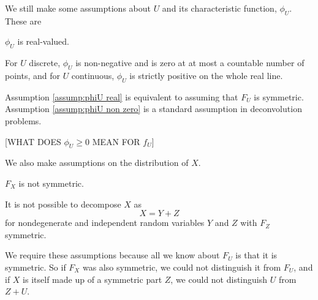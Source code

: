 
	We still make some assumptions about $U$ and its characteristic function, $\phi_U$. These are 
	\begin{assumption}
	\label{assump:phiU real}
		$\phi_U$ is real-valued.
	\end{assumption}
	\begin{assumption}
	\label{assump:phiU non zero}
		For $U$ discrete, $\phi_U$ is non-negative and is zero at at most a countable number of points, and for $U$ continuous, $\phi_U$ is strictly positive on the whole real line.
	\end{assumption}

	Assumption \ref{assump:phiU real} is equivalent to assuming that $F_U$ is symmetric. Assumption \ref{assump:phiU non zero} is a standard assumption in deconvolution problems.

	[WHAT DOES $\phi_U \geq 0$ MEAN FOR $f_U$]

	We also make assumptions on the distribution of $X$. 
	\begin{assumption}
	\label{assumpt: X not symmetric}
		$F_X$ is not symmetric.
	\end{assumption}
	\begin{assumption}
		\label{assump: X indecomposable}
		It is not possible to decompose $X$ as
		\begin{equation}
			X = Y + Z
		\end{equation}
		for nondegenerate and independent random variables $Y$ and $Z$ with $F_Z$ symmetric.
	\end{assumption}

	We require these assumptions because all we know about $F_U$ is that it is symmetric. So if $F_X$ was also symmetric, we could not distinguish it from $F_U$, and if $X$ is itself made up of a symmetric part $Z$, we could not distinguish $U$ from $Z+U$.


